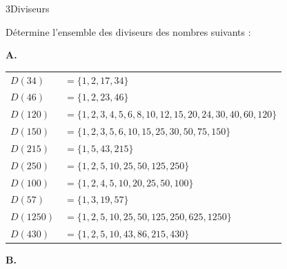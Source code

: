 \begin{exercice}{3}{Diviseurs}

Détermine l'ensemble des diviseurs des nombres suivants :
\bigskip

\textbf{A.}

\medskip
{}%
{\def\arraystretch{1.2}
\begin{tabularx}{\linewidth}{lX}
$D(34)$   & $= \{1, 2, 17, 34\}$ \\
$D(46)$   & $= \{1, 2, 23, 46\}$ \\
$D(120)$  & $= \{1, 2, 3, 4, 5, 6, 8, 10, 12, 15, 20, 24, 30, 40, 60, 120\}$ \\
$D(150)$  & $= \{1, 2, 3, 5, 6, 10, 15, 25, 30, 50, 75, 150\}$ \\
$D(215)$  & $= \{1, 5, 43, 215\}$ \\
$D(250)$  & $= \{1, 2, 5, 10, 25, 50, 125, 250\}$ \\
$D(100)$  & $= \{1, 2, 4, 5, 10, 20, 25, 50, 100\}$ \\
$D(57)$   & $= \{1, 3, 19, 57\}$ \\
$D(1250)$ & $= \{1, 2, 5, 10, 25, 50, 125, 250, 625, 1250\}$ \\
$D(430)$  & $= \{1, 2, 5, 10, 43, 86, 215, 430\}$ \\
\end{tabularx}
\def\arraystretch{1}}

\vspace{20pt}

\textbf{B.}


\end{exercice}
